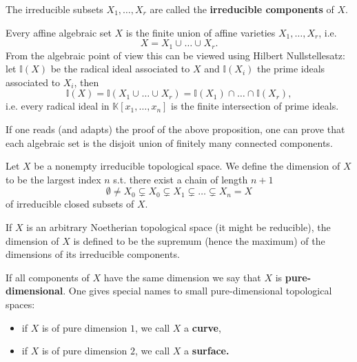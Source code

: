 \begin{defn}
	The irreducible subsets $X_1, \ldots, X_r$ are called the \textbf{irreducible components} of $X$.
\end{defn}

\begin{cor}
	Every affine algebraic set $X$ is the finite union of affine varieties $X_1, \ldots, X_r$, i.e.
	\begin{equation}
	X = X_1 \cup_{} \ldots \cup_{} X_r
	.\end{equation} 
	From the algebraic point of view this can be viewed using Hilbert Nullstellesatz:
	let $\mathbb{I}(X)$ be the radical ideal associated to $X$ and $\mathbb{I}(X_i)$ the prime ideals associated to $X_i$, then
	\begin{equation}
		\mathbb{I}(X) = \mathbb{I}\left( X_1 \cup_{} \ldots \cup_{} X_r \right) = \mathbb{I}\left( X_1 \right) \cap_{} \ldots \cap_{} \mathbb{I}\left( X_r \right)
	,\end{equation} 
	i.e. every radical ideal in $\mathbb{K}\left[x_1, \ldots, x_n \right]$ is the finite intersection of prime ideals.
\end{cor} 

\begin{rem}
	If one reads (and adapts) the proof of the above proposition, one can prove that each algebraic set is the disjoit union of finitely many connected components.
\end{rem}

\begin{defn}
	Let $X$ be a nonempty irreducible topological space.
	We define the dimension of $X$ to be the largest index $n$ s.t. there exist a chain of length $n+1$ 
	\begin{equation}
	\emptyset \neq X_0 \subsetneq X_0 \subsetneq X_1 \subsetneq \ldots \subsetneq X_n = X
	\end{equation} 
	of irreducible closed subsets of $X$.

	If $X$ is an arbitrary Noetherian topological space (it might be reducible), the dimension of $X$ is defined to be the supremum (hence the maximum) of the dimensions of its irreducible components.
\end{defn}
\begin{rem}
	If all components of $X$ have the same dimension we say that $X$ is \textbf{pure-dimensional}.
	One gives special names to small pure-dimensional topological spaces:
	\begin{itemize}
		\item if $X$ is of pure dimension $1$, we call $X$ a \textbf{curve},
		\item if $X$ is of pure dimension $2$, we call $X$ a \textbf{surface.}
	\end{itemize}
\end{rem}

